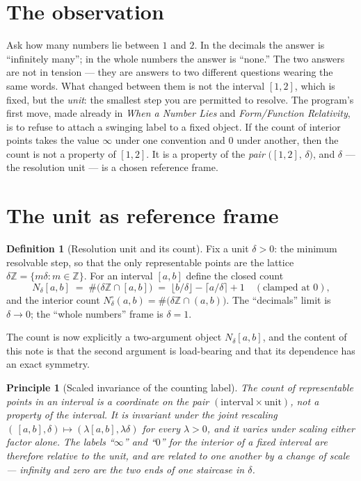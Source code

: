 \documentclass[11pt]{article}
\theoremstyle{definition}
\newtheorem{definition}{Definition}
\theoremstyle{plain}
\newtheorem{principle}{Principle}
\newcommand{\Z}{\mathbb{Z}}
\begin{document}
\section{The observation}\label{sec:obs}

Ask how many numbers lie between $1$ and $2$. In the decimals the answer is ``infinitely many'';
in the whole numbers the answer is ``none.'' The two answers are not in tension --- they are answers
to two different questions wearing the same words. What changed between them is not the interval
$[1,2]$, which is fixed, but the \emph{unit}: the smallest step you are permitted to resolve. The
program's first move, made already in \textit{When a Number Lies} and \textit{Form/Function
Relativity}, is to refuse to attach a swinging label to a fixed object. If the count of interior
points takes the value $\infty$ under one convention and $0$ under another, then the count is not a
property of $[1,2]$. It is a property of the \emph{pair} $\big([1,2],\,\delta\big)$, and $\delta$ ---
the resolution unit --- is a chosen reference frame.

\section{The unit as reference frame}\label{sec:frame}

\begin{definition}[Resolution unit and its count]\label{def:count}
Fix a unit $\delta>0$: the minimum resolvable step, so that the only representable points are the
lattice $\delta\Z=\{m\delta : m\in\Z\}$. For an interval $[a,b]$ define the closed count
\[
  N_\delta[a,b]\;=\;\#\big(\delta\Z\cap[a,b]\big)\;=\;\big\lfloor b/\delta\big\rfloor-\big\lceil a/\delta\big\rceil+1
  \quad(\text{clamped at }0),
\]
and the interior count $N_\delta^{\circ}(a,b)=\#\big(\delta\Z\cap(a,b)\big)$. The ``decimals'' limit is
$\delta\to 0$; the ``whole numbers'' frame is $\delta=1$.
\end{definition}

The count is now explicitly a two-argument object $N_\delta[a,b]$, and the content of this note is
that the second argument is load-bearing and that its dependence has an exact symmetry.

\begin{principle}[Scaled invariance of the counting label]\label{prin:scaled}
The count of representable points in an interval is a coordinate on the pair
$(\text{interval}\times\text{unit})$, not a property of the interval. It is \emph{invariant} under the
joint rescaling $(\,[a,b],\delta)\mapsto(\lambda[a,b],\lambda\delta)$ for every $\lambda>0$, and it
\emph{varies} under scaling either factor alone. The labels ``$\infty$'' and ``$0$'' for the interior
of a fixed interval are therefore relative to the unit, and are related to one another by a change of
scale --- infinity and zero are the two ends of one staircase in $\delta$.
\end{principle}
\end{document}
